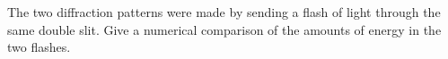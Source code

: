 The two diffraction patterns were made by sending a flash of
light through the same double slit. Give a numerical comparison
of the amounts of energy in the two flashes.\answercheck\hwendpart

